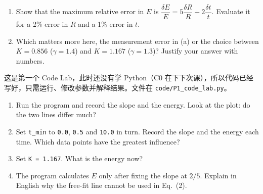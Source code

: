 \documentclass[11pt,a4paper]{article}
\begin{document}
\begin{enumerate}[label=(\alph*)]
  \item Show that the maximum relative error in $E$ is $\dfrac{\delta E}{E}=5\dfrac{\delta R}{R}+2\dfrac{\delta t}{t}$. Evaluate it for a 2\% error in $R$ and a 1\% error in $t$.
  \item Which matters more here, the measurement error in (a) or the choice between $K=0.856$ ($\gamma=1.4$) and $K=1.167$ ($\gamma=1.3$)? Justify your answer with numbers.
\end{enumerate}


这是第一个 Code Lab，此时还没有学 Python（C0 在下下次课），所以代码已经写好，只需运行、修改参数并解释结果。文件在 \texttt{code/P1\_code\_lab.py}。



\begin{enumerate}[label=\textbf{\arabic*.}]
  \item Run the program and record the slope and the energy. Look at the plot: do the two lines differ much?
  \item Set \texttt{t\_min} to \texttt{0.0}, \texttt{0.5} and \texttt{10.0} in turn. Record the slope and the energy each time. Which data points have the greatest influence?
  \item Set \texttt{K = 1.167}. What is the energy now?
  \item The program calculates $E$ only after fixing the slope at $2/5$. Explain in English why the free-fit line cannot be used in Eq.~(2).
\end{enumerate}

\end{document}
